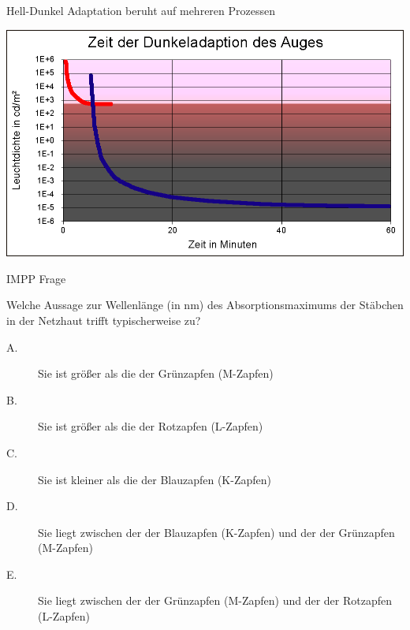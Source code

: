 \documentclass{beamer}
\begin{document}
\begin{frame}{Hell-Dunkel Adaptation beruht auf mehreren Prozessen}

\begin{center}
    \includegraphics[width=\textwidth]{Hdadaptrp.png}
    \end{center}
    
\end{frame}



\begin{frame}{IMPP Frage}

Welche Aussage zur Wellenlänge (in nm) des Absorptionsmaximums der Stäbchen in der Netzhaut trifft typischerweise zu?

\begin{description}
\item[A.] Sie ist größer als die der Grünzapfen (M-Zapfen)
\item[B.] Sie ist größer als die der Rotzapfen (L-Zapfen) 
\item[C.] Sie ist kleiner als die der Blauzapfen (K-Zapfen) 
\item[D.] Sie liegt zwischen der der Blauzapfen (K-Zapfen) und der der Grünzapfen (M-Zapfen) %
\item[E.] Sie liegt zwischen der der Grünzapfen (M-Zapfen) und der der Rotzapfen (L-Zapfen) 
\end{description}

    
\end{frame}
\end{document}
